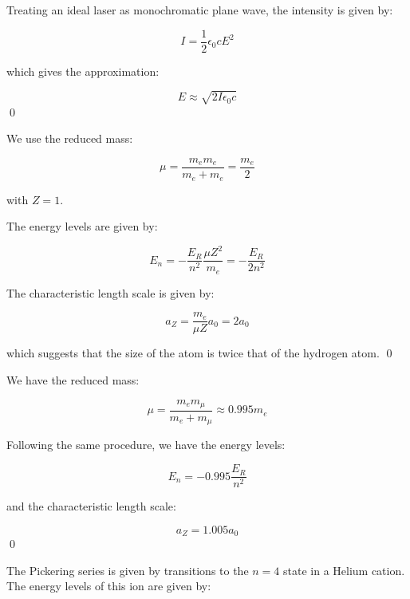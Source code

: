 \documentclass[12pt]{article}
\begin{document}
Treating an ideal laser as monochromatic plane wave, the intensity is given by:

\begin{equation}
    I = \frac{1}{2} \epsilon_{0} c E^{2}
\end{equation}

which gives the approximation:

\begin{equation}
    E \approx \sqrt{2I\epsilon_{0}c}
\end{equation}
\qed


We use the reduced mass:

\begin{equation}
    \mu = \frac{m_{e} m_{e}}{m_{e} + m_{e}} = \frac{m_{e}}{2}
\end{equation}

with $Z = 1$.

The energy levels are given by:

\begin{equation}
    E_{n} = - \frac{E_{R}}{n^{2}} \frac{\mu Z^{2}}{m_{e}} = - \frac{E_{R}}{2n^{2}}
\end{equation}

The characteristic length scale is given by:

\begin{equation}
    a_{Z} = \frac{m_{e}}{\mu Z} a_{0} = 2 a_{0}
\end{equation}

which suggests that the size of the atom is twice that of the hydrogen atom.
\qed


We have the reduced mass:

\begin{equation}
    \mu = \frac{m_{e} m_{\mu}}{m_{e} + m_{\mu}} \approx 0.995 m_{e}
\end{equation}

Following the same procedure, we have the energy levels:

\begin{equation}
    E_{n} = -0.995 \frac{E_{R}}{n^{2}}
\end{equation}

and the characteristic length scale:

\begin{equation}
    a_{Z} = 1.005 a_{0}
\end{equation}
\qed


The Pickering series is given by transitions to the $n = 4$ state in a Helium cation. The energy levels of this ion are given by:
\end{document}
